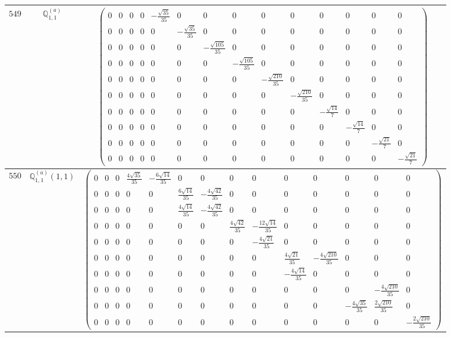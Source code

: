 \documentclass[fleqn,8pt,landscape]{jsarticle}
\begin{document}
\begin{center}
\begin{longtable}{ccc}
$ 549 $ & $ \mathbb{Q}_{1,1}^{(a)} $ & $ \begin{pmatrix} 0 & 0 & 0 & 0 & - \frac{\sqrt{35}}{35} & 0 & 0 & 0 & 0 & 0 & 0 & 0 & 0 & 0 \\ 0 & 0 & 0 & 0 & 0 & - \frac{\sqrt{35}}{35} & 0 & 0 & 0 & 0 & 0 & 0 & 0 & 0 \\ 0 & 0 & 0 & 0 & 0 & 0 & - \frac{\sqrt{105}}{35} & 0 & 0 & 0 & 0 & 0 & 0 & 0 \\ 0 & 0 & 0 & 0 & 0 & 0 & 0 & - \frac{\sqrt{105}}{35} & 0 & 0 & 0 & 0 & 0 & 0 \\ 0 & 0 & 0 & 0 & 0 & 0 & 0 & 0 & - \frac{\sqrt{210}}{35} & 0 & 0 & 0 & 0 & 0 \\ 0 & 0 & 0 & 0 & 0 & 0 & 0 & 0 & 0 & - \frac{\sqrt{210}}{35} & 0 & 0 & 0 & 0 \\ 0 & 0 & 0 & 0 & 0 & 0 & 0 & 0 & 0 & 0 & - \frac{\sqrt{14}}{7} & 0 & 0 & 0 \\ 0 & 0 & 0 & 0 & 0 & 0 & 0 & 0 & 0 & 0 & 0 & - \frac{\sqrt{14}}{7} & 0 & 0 \\ 0 & 0 & 0 & 0 & 0 & 0 & 0 & 0 & 0 & 0 & 0 & 0 & - \frac{\sqrt{21}}{7} & 0 \\ 0 & 0 & 0 & 0 & 0 & 0 & 0 & 0 & 0 & 0 & 0 & 0 & 0 & - \frac{\sqrt{21}}{7} \end{pmatrix} $ \\ \hline
$ 550 $ & $ \mathbb{Q}_{1,1}^{(a)}(1,1) $ & $ \begin{pmatrix} 0 & 0 & 0 & \frac{4 \sqrt{35}}{35} & - \frac{6 \sqrt{14}}{35} & 0 & 0 & 0 & 0 & 0 & 0 & 0 & 0 & 0 \\ 0 & 0 & 0 & 0 & 0 & \frac{6 \sqrt{14}}{35} & - \frac{4 \sqrt{42}}{35} & 0 & 0 & 0 & 0 & 0 & 0 & 0 \\ 0 & 0 & 0 & 0 & 0 & \frac{4 \sqrt{14}}{35} & - \frac{4 \sqrt{42}}{35} & 0 & 0 & 0 & 0 & 0 & 0 & 0 \\ 0 & 0 & 0 & 0 & 0 & 0 & 0 & \frac{4 \sqrt{42}}{35} & - \frac{12 \sqrt{14}}{35} & 0 & 0 & 0 & 0 & 0 \\ 0 & 0 & 0 & 0 & 0 & 0 & 0 & 0 & - \frac{4 \sqrt{21}}{35} & 0 & 0 & 0 & 0 & 0 \\ 0 & 0 & 0 & 0 & 0 & 0 & 0 & 0 & 0 & \frac{4 \sqrt{21}}{35} & - \frac{4 \sqrt{210}}{35} & 0 & 0 & 0 \\ 0 & 0 & 0 & 0 & 0 & 0 & 0 & 0 & 0 & - \frac{4 \sqrt{14}}{35} & 0 & 0 & 0 & 0 \\ 0 & 0 & 0 & 0 & 0 & 0 & 0 & 0 & 0 & 0 & 0 & 0 & - \frac{4 \sqrt{210}}{35} & 0 \\ 0 & 0 & 0 & 0 & 0 & 0 & 0 & 0 & 0 & 0 & 0 & - \frac{4 \sqrt{35}}{35} & \frac{2 \sqrt{210}}{35} & 0 \\ 0 & 0 & 0 & 0 & 0 & 0 & 0 & 0 & 0 & 0 & 0 & 0 & 0 & - \frac{2 \sqrt{210}}{35} \end{pmatrix} $ \\ \hline

\end{longtable}
\end{center}
\end{document}
